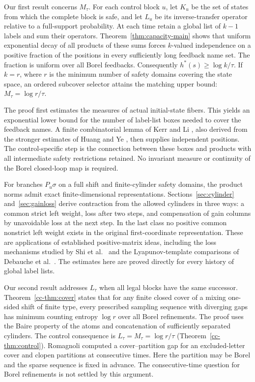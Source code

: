 \documentclass[11pt,reqno]{amsart}
\numberwithin{equation}{section}
\theoremstyle{definition}
\begin{document}
Our first result concerns $M_\tau$. For each control block $u$, let
$K_u$ be the set of states from which the complete block is safe, and
let $L_u$ be its inverse-transfer operator relative to a full-support
probability. At each time retain a global list of $k-1$ labels and sum
their operators. Theorem~\ref{thm:capacity-main} shows that uniform
exponential decay of all products of these sums forces $k$-valued
independence on a positive fraction of the positions in every sufficiently
long feedback name set. The fraction is uniform over all Borel feedbacks.
Consequently $h^*(s)\ge\log k/\tau$. If $k=r$, where $r$ is the
minimum number of safety domains covering the state space, an ordered
subcover selector attains the matching upper bound:
$M_\tau=\log r/\tau$.

The proof first estimates the measures of actual initial-state fibers.
This yields an exponential lower bound for the number of label-list
boxes needed to cover the feedback names. A finite combinatorial lemma
of Kerr and Li \cite[Lemma~3.3]{KL2007}, also derived from the stronger
estimates of Huang and Ye \cite[Lemma~4.1 and Remark~4.2]{HuangYe2009},
then supplies independent positions. The control-specific step is the
connection between these boxes and products with all intermediate safety
restrictions retained. No invariant measure or continuity of the Borel
closed-loop map is required.

For branches $P_u\sigma$ on a full shift and finite-cylinder safety
domains, the product norms admit exact finite-dimensional
representations. Sections~\ref{sec:cylinder} and~\ref{sec:gainloss}
derive contraction from the allowed cylinders in three ways: a common
strict left weight, loss after two steps, and compensation of gain
columns by unavoidable loss at the next step. In the last class no
positive common nonstrict left weight exists in the original
first-coordinate representation. These are applications of established
positive-matrix ideas, including the loss mechanisms studied by
Shi et al.\ \cite{Shi2021} and the Lyapunov-template comparisons of
Debauche et al.\ \cite{Debauche2022}. The estimates here are proved
directly for every history of global label lists.

Our second result addresses $L_\tau$ when all legal blocks have the
same successor. Theorem~\ref{cc-thm:cover} states that for any finite
closed cover of a mixing one-sided shift of finite type, every prescribed
sampling sequence with diverging gaps has minimum counting entropy
$\log r$ over all Borel refinements. The proof uses the Baire property
of the atoms and concatenation of sufficiently separated cylinders.
The control consequence is $L_\tau=M_\tau=\log r/\tau$
(Theorem~\ref{cc-thm:control}). Romagnoli \cite{Romagnoli2007}
computed a cover--partition gap for an excluded-letter cover and clopen
partitions at consecutive times. Here the partition may be Borel and
the sparse sequence is fixed in advance. The consecutive-time question
for Borel refinements is not settled by this argument.
\end{document}
